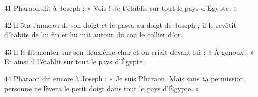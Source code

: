 
41 Pharaon dit à Joseph : « Vois ! Je t’établis sur tout le pays d’Égypte. »

42 Il ôta l’anneau de son doigt et le passa au doigt de Joseph ; il le revêtit d’habits de lin fin et lui mit autour du cou le collier d’or.

43 Il le fit monter sur son deuxième char et on criait devant lui : « À genoux ! » Et ainsi il l’établit sur tout le pays d’Égypte.

44 Pharaon dit encore à Joseph : « Je suis Pharaon. Mais sans ta permission, personne ne lèvera le petit doigt dans tout le pays d’Égypte. »